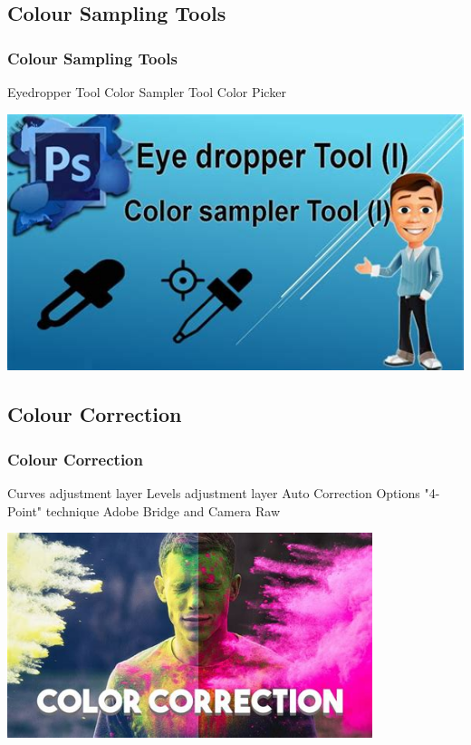 \documentclass{beamer}
\begin{document}
			\subsection{Colour Sampling Tools}		
				\begin{frame}
					\frametitle{Colour Sampling Tools}
					\begin{outline}
						\1 Eyedropper Tool
						\1 Color Sampler Tool
						\1 Color Picker
					\end{outline}
					\includegraphics[width=1.0\textwidth]{images/color sampling tools.jpg}
				\end{frame}
			
		\subsection{Colour Correction}		
			\begin{frame}
				\frametitle{Colour Correction}
				\begin{outline}
					\1 Curves adjustment layer
					\1 Levels adjustment layer
					\1 Auto Correction Options
					\1 "4-Point" technique
					\1 Adobe Bridge and Camera Raw
				\end{outline}
			\includegraphics[width=0.8\textwidth]{images/color correction.jpg}
			\end{frame}
			
\end{document}
